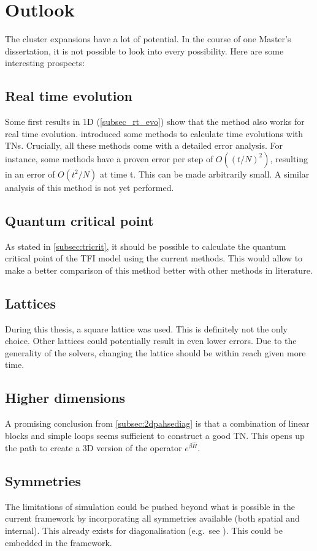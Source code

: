 \section{Outlook}

The cluster expansions have a lot of potential. In the course of one Master's dissertation, it is not possible to look into every possibility. Here are some interesting prospects:

\subsection*{Real time evolution}

Some first results in 1D (\cref{subsec_rt_evo}) show that the method also works for real time evolution.  introduced some methods to calculate time evolutions with \Glspl{TN}. Crucially, all these methods come with a detailed error analysis. For instance, some methods have a proven error per step of $O \left( (t/N)^2  \right)$, resulting in an error of $O \left( t^2/N  \right)$ at time t. This can be made arbitrarily small. A similar analysis of this method is not yet performed.

\subsection*{Quantum critical point}

As stated in \cref{subsec:tricrit}, it should be possible to calculate the quantum critical point of the \Gls{TFI} model using the current methods. This would allow to make a better comparison of this method better with other methods in literature.

\subsection*{Lattices}

During this thesis, a square lattice was used. This is definitely not the only choice. Other lattices could potentially result in even lower errors. Due to the generality of the solvers, changing the lattice should be within reach given more time.

\subsection*{Higher dimensions}

A promising conclusion from \cref{subsec:2dpahsediag} is that a combination of linear blocks and simple loops seems sufficient to construct a good \Gls{TN}. This opens up the path to create a 3D version of the operator $e^{\beta \hat{H}}$.

\subsection*{Symmetries}

The limitations of simulation could be pushed beyond what is possible in the current framework by incorporating all symmetries available (both spatial and internal). This already exists for diagonalisation (e.g.\ see \cite{Wietek2018}). This could be embedded in the framework.
